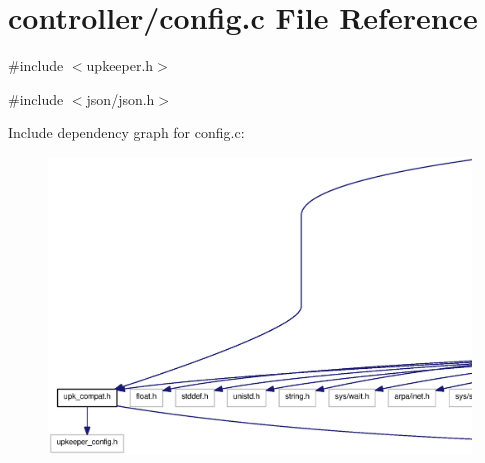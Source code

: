 \section{controller/config.c File Reference}
\label{controller_2config_8c}
{\ttfamily \#include $<$upkeeper.h$>$}\par
{\ttfamily \#include $<$json/json.h$>$}\par
Include dependency graph for config.c:
\nopagebreak
\begin{figure}[H]
\begin{center}
\leavevmode
\includegraphics[width=400pt]{controller_2config_8c__incl}
\end{center}
\end{figure}
